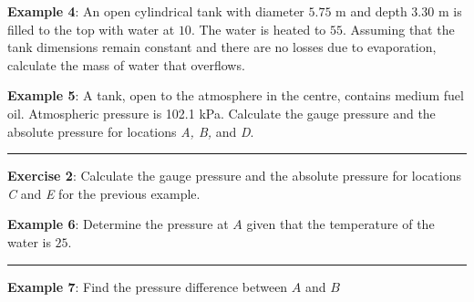 \documentclass[10pt]{amsart}
\begin{document}
\newpage

\begin{minipage}{0.45\textwidth}
	\raggedright
	\textbf{Example 4}:\parb
	An open cylindrical tank with diameter $5.75$ m and depth $3.30$ m is filled to the top with water at $10$\textcelsius.
	The water is heated to $55$\textcelsius. Assuming that the tank dimensions remain constant and there are no losses due to evaporation, calculate the mass of water that overflows.
\end{minipage}
\newpage

\begin{minipage}{0.45\textwidth}
	\raggedright
	\textbf{Example 5}:
	A tank, open to the atmosphere in the centre, contains medium fuel
	oil. Atmospheric pressure is 102.1 kPa. Calculate the gauge pressure
	and the absolute pressure for locations \emph{A, B,} and \emph{D}.
	
\end{minipage}
\pars\vspace{7cm}
\rule{\textwidth}{0.02in}
\pars
\begin{minipage}[t]{0.45\textwidth}
	\textbf{Exercise 2}:
	\parb
	Calculate the gauge pressure and the absolute pressure for locations \emph{C} and \emph{E} for the previous example.
	
\end{minipage}
\newpage
\begin{minipage}[t]{0.45\textwidth}
	\raggedright
	\textbf{Example 6}:\parb
	Determine the pressure at $A$ given that the temperature of the
	water is $25$\textcelsius.
	\par\vspace{5cm}
\end{minipage}

\par\vspace{-1cm}
\rule{\textwidth}{0.02in}
\parb
\begin{minipage}[t]{0.45\textwidth}
	\raggedright
	\textbf{Example 7}:\parb
	Find the pressure difference between $A$ and $B$
	\par\vspace{6cm}
\end{minipage}
\end{document}
